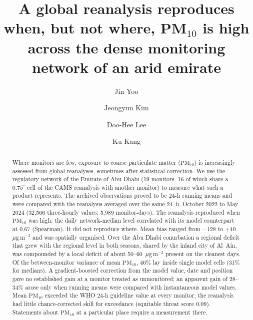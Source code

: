 \documentclass[preprint,review,12pt,number,sort&compress]{elsarticle}
\newcommand*{\ugm}{\ensuremath{\mu\mathrm{g\,m^{-3}}}}
\newcommand*{\pmten}{\ensuremath{\mathrm{PM_{10}}}}
\begin{document}
\begin{frontmatter}

\title{A global reanalysis reproduces when, but not where, PM$_{10}$ is high across the dense
monitoring network of an arid emirate}

\author[cbrn]{Jin Yoo}
\author[snu]{Jeongyun Kim}
\author[kma]{Doo-Hee Lee}
\author[cbrn]{Ku Kang}



\begin{abstract}
Where monitors are few, exposure to coarse particulate matter (\pmten{}) is increasingly
assessed from global reanalyses, sometimes after statistical correction. We use the
regulatory network of the Emirate of Abu Dhabi (19 monitors, 16 of which share a $0.75^{\circ}$
cell of the CAMS reanalysis with another monitor) to measure what such a product represents. The
archived observations proved to be 24-h running means and were compared with the reanalysis
averaged over the same 24~h, October 2022 to May 2024 (32,566 three-hourly values; 5,989
monitor-days). The reanalysis reproduced when \pmten{} was high: the daily network-median level
correlated with its model counterpart at 0.67 (Spearman). It did not reproduce where. Mean bias
ranged from $-128$ to $+40$~\ugm{} and was spatially organised. Over the Abu Dhabi conurbation a
regional deficit that grew with the regional level in both seasons, shared by the inland city of
Al~Ain, was compounded by a local deficit of about 50--60~\ugm{} present on the cleanest
days. Of the
between-monitor variance of mean \pmten{}, 46\% lay inside single model cells (31\% for medians).
A gradient-boosted correction from the model value, date and position gave no established gain
at a monitor treated as unmonitored; an
apparent gain of 28--34\% arose only when running means were compared with instantaneous model
values. Mean \pmten{} exceeded the WHO 24-h guideline value at every monitor; the reanalysis had
little chance-corrected skill for exceedance (equitable threat score 0.09). Statements about
\pmten{} at a particular place require a measurement there.
\end{abstract}


\end{frontmatter}
\end{document}
